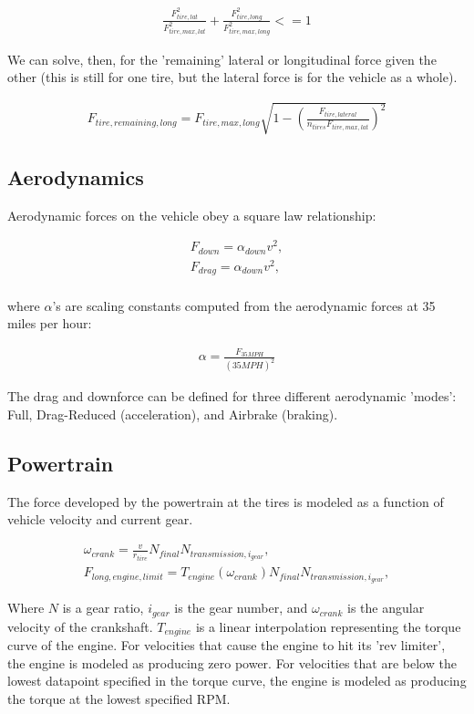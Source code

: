 \documentclass{article}
\begin{document}
\begin{align}
	\frac{F_{tire,lat}^2}{F_{tire,max,lat}^2} + \frac{F_{tire,long}^2}{F_{tire,max,long}^2} <= 1
\end{align}

We can solve, then, for the 'remaining' lateral or longitudinal force given the other (this is still for one tire, but the lateral force is for the vehicle as a whole).

\begin{align}
	F_{tire,remaining,long} = F_{tire,max,long} \sqrt{1-(\frac{F_{tire,lateral}}{n_{tires} F_{tire,max,lat}})^2} 
\end{align}

\subsection{Aerodynamics}

Aerodynamic forces on the vehicle obey a square law relationship:

\begin{align}
	F_{down} = \alpha_{down} v^2, \\
	F_{drag} = \alpha_{down} v^2, \\
\end{align}

where $\alpha$'s are scaling constants computed from the aerodynamic forces at 35 miles per hour:

\begin{align}
	\alpha = \frac{F_{35 MPH}}{(35 MPH)^2}
\end{align}

The drag and downforce can be defined for three different aerodynamic 'modes': Full, Drag-Reduced (acceleration), and Airbrake (braking).

\subsection{Powertrain}

The force developed by the powertrain at the tires is modeled as a function of vehicle velocity and current gear.

\begin{align}
	\omega_{crank} = \frac{v}{r_{tire}} N_{final} N_{transmission,i_{gear}}, \\
	F_{long,engine,limit} = T_{engine}(\omega_{crank}) N_{final} N_{transmission,i_{gear}},
\end{align}

Where $N$ is a gear ratio, $i_{gear}$ is the gear number, and $\omega_{crank}$ is the angular velocity of the crankshaft. $T_{engine}$ is a linear interpolation representing the torque curve of the engine. For velocities that cause the engine to hit its 'rev limiter', the engine is modeled as producing zero power. For velocities that are below the lowest datapoint specified in the torque curve, the engine is modeled as producing the torque at the lowest specified RPM.
\end{document}
